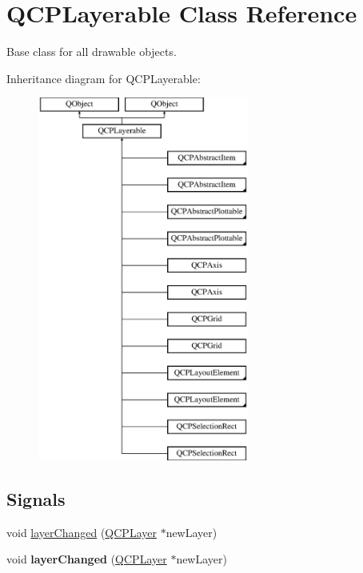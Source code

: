 \hypertarget{class_q_c_p_layerable}{}\section{Q\+C\+P\+Layerable Class Reference}
\label{class_q_c_p_layerable}


Base class for all drawable objects.  


Inheritance diagram for Q\+C\+P\+Layerable\+:\begin{figure}[H]
\begin{center}
\leavevmode
\includegraphics[height=12.000000cm]{class_q_c_p_layerable}
\end{center}
\end{figure}
\subsection*{Signals}
\begin{DoxyCompactItemize}
\item 
void \hyperlink{class_q_c_p_layerable_abbf8657cedea73ac1c3499b521c90eba}{layer\+Changed} (\hyperlink{class_q_c_p_layer}{Q\+C\+P\+Layer} $\ast$new\+Layer)
\item 
\mbox{\label{class_q_c_p_layerable_abbf8657cedea73ac1c3499b521c90eba}} 
void {\bfseries layer\+Changed} (\hyperlink{class_q_c_p_layer}{Q\+C\+P\+Layer} $\ast$new\+Layer)
\end{DoxyCompactItemize}
